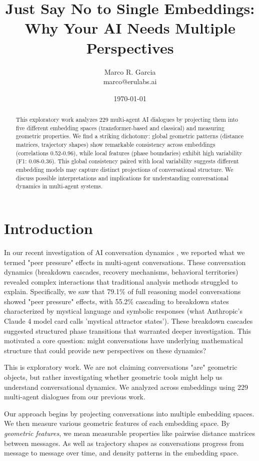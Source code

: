 \documentclass[11pt,letterpaper]{article}
\title{Just Say No to Single Embeddings: Why Your AI Needs Multiple Perspectives}
\author{
Marco R. Garcia \\
marco@erulabs.ai
}
\date{\today}
\newcommand{\totalConversations}{229}
\begin{document}
\maketitle

\begin{abstract}
This exploratory work analyzes \totalConversations{} multi-agent AI dialogues by projecting them into five different embedding spaces (transformer-based and classical) and measuring geometric properties. We find a striking dichotomy: global geometric patterns (distance matrices, trajectory shapes) show remarkable consistency across embeddings (correlations 0.52-0.96), while local features (phase boundaries) exhibit high variability (F1: 0.08-0.36). This global consistency paired with local variability suggests different embedding models may capture distinct projections of conversational structure. We discuss possible interpretations and implications for understanding conversational dynamics in multi-agent systems.
\end{abstract}

\section{Introduction}

In our recent investigation of AI conversation dynamics \citep{garcia2025peer}, we reported what we termed "peer pressure" effects in multi-agent conversations. These conversation dynamics (breakdown cascades, recovery mechanisms, behavioral territories) revealed complex interactions that traditional analysis methods struggled to explain. Specifically, we saw that 79.1\% of full reasoning model conversations showed "peer pressure" effects, with 55.2\% cascading to breakdown states characterized by mystical language and symbolic responses (what Anthropic's Claude 4 model card calls 'mystical attractor states'). These breakdown cascades suggested structured phase transitions that warranted deeper investigation. This motivated a core question: might conversations have underlying mathematical structure that could provide new perspectives on these dynamics? 

This is exploratory work. We are not claiming conversations "are" geometric objects, but rather investigating whether geometric tools might help us understand conversational dynamics. We analyzed across embeddings using \totalConversations{} multi-agent dialogues from our previous work. 

Our approach begins by projecting conversations into multiple embedding spaces. We then measure various geometric features of each embedding space. By \textit{geometric features}, we mean measurable properties like pairwise distance matrices between messages. As well as trajectory shapes as conversations progress from message to message over time, and density patterns in the embedding space.
\end{document}
